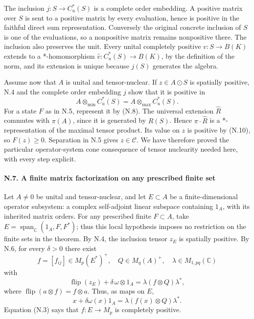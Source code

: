 \documentclass[
  11pt,
]{article}
\begin{document}
The inclusion \(j:S\to C_u^*(S)\) is a complete order embedding. A
positive matrix over \(S\) is sent to a positive matrix by every
evaluation, hence is positive in the faithful direct sum representation.
Conversely the original concrete inclusion of \(S\) is one of the
evaluations, so a nonpositive matrix remains nonpositive there. The
inclusion also preserves the unit. Every unital completely positive
\(v:S\to B(K)\) extends to a *-homomorphism
\(\widehat v:C_u^*(S)\to B(K)\), by the definition of the norm, and its
extension is unique because \(j(S)\) generates the algebra.

Assume now that \(A\) is unital and tensor-nuclear. If \(z\in A\odot S\)
is spatially positive, N.4 and the complete order embedding \(j\) show
that it is positive in \[
A\otimes_{\min}C_u^*(S)
=A\otimes_{\max}C_u^*(S).
\tag{N.10}
\] For a state \(F\) as in N.5, represent it by (N.8). The universal
extension \(\widehat R\) commutes with \(\pi(A)\), since it is generated
by \(R(S)\). Hence \(\pi\cdot\widehat R\) is a *-representation of the
maximal tensor product. Its value on \(z\) is positive by (N.10), so
\(F(z)\geq0\). Separation in N.5 gives \(z\in\mathcal C\). We have
therefore proved the particular operator-system cone consequence of
tensor nuclearity needed here, with every step explicit.

\paragraph{N.7. A finite matrix factorization on any prescribed finite
set}\label{n.7.-a-finite-matrix-factorization-on-any-prescribed-finite-set}

Let \(A\ne0\) be unital and tensor-nuclear, and let \(E\subset A\) be a
finite-dimensional operator subsystem: a complex self-adjoint linear
subspace containing \(1_A\), with its inherited matrix orders. For any
prescribed finite \(F\subset A\), take
\(E=\operatorname{span}_{\mathbb C}(1_A,F,F^*)\); thus this local
hypothesis imposes no restriction on the finite sets in the theorem. By
N.4, the inclusion tensor \(z_E\) is spatially positive. By N.6, for
every \(\delta>0\) there exist \[
f=[f_{ij}]\in M_p(E^*)^+,\quad
Q\in M_q(A)^+,\quad \lambda\in M_{1,pq}(\mathbb C)
\] with \[
\operatorname{flip}(z_E)+\delta\,\omega\otimes1_A
=\lambda(f\otimes Q)\lambda^*,
\tag{N.11}
\] where \(\operatorname{flip}(a\otimes f)=f\otimes a\). Thus, as maps
on \(E\), \[
x+\delta\omega(x)1_A=\lambda(f(x)\otimes Q)\lambda^*.
\tag{N.12}
\] Equation (N.3) says that \(f:E\to M_p\) is completely positive.
\end{document}
